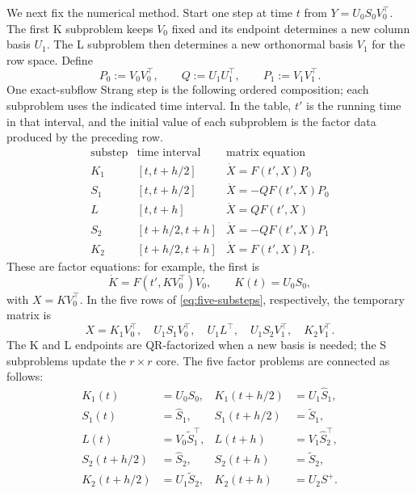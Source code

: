 \documentclass[10pt,a4paper]{amsart}
\numberwithin{equation}{section}
\begin{document}
We next fix the numerical method.  Start one step at time $t$ from
$Y=U_0S_0V_0^\top$.  The first K subproblem keeps $V_0$ fixed and
its endpoint determines a new column basis $U_1$.  The L subproblem
then determines a new orthonormal basis $V_1$ for the row space.  Define
\begin{equation}\label{eq:projectors-one-step}
 P_0:=V_0V_0^\top,\qquad Q:=U_1U_1^\top,
 \qquad P_1:=V_1V_1^\top.
\end{equation}
One exact-subflow Strang step is the following ordered composition; each
subproblem uses the indicated time interval.  In the table, \(t'\)
is the running time in that interval, and the initial value of each
subproblem is the factor data produced by the preceding row.
\begin{equation}\label{eq:five-substeps}
\begin{array}{c|c|c}
\text{substep}&\text{time interval}&\text{matrix equation}\\
\hline
K_1&[t,t+h/2]&\dot X=F(t',X)P_0\\
S_1&[t,t+h/2]&\dot X=-QF(t',X)P_0\\
L  &[t,t+h]  &\dot X=QF(t',X)\\
S_2&[t+h/2,t+h]&\dot X=-QF(t',X)P_1\\
K_2&[t+h/2,t+h]&\dot X=F(t',X)P_1.
\end{array}
\end{equation}
These are factor equations: for example, the first is
\[
 \dot K=F(t',KV_0^\top)V_0,\qquad K(t)=U_0S_0,
\]
with $X=KV_0^\top$.  In the five rows of
\eqref{eq:five-substeps}, respectively, the temporary matrix is
\begin{equation}\label{eq:five-factor-representations}
 X=K_1V_0^\top,\quad U_1S_1V_0^\top,\quad U_1L^\top,
 \quad U_1S_2V_1^\top,\quad K_2V_1^\top.
\end{equation}
The K and L endpoints are QR-factorized when a
new basis is needed; the S subproblems update the $r\times r$ core.
The five factor problems are connected as follows:
\begin{equation}\label{eq:factor-transfers}
\begin{aligned}
 K_1(t)&=U_0S_0,
 &K_1(t+h/2)&=U_1\widehat S_1,\\
 S_1(t)&=\widehat S_1,
 &S_1(t+h/2)&=\widetilde S_1,\\
 L(t)&=V_0\widetilde S_1^\top,
 &L(t+h)&=V_1\widehat S_2^\top,\\
 S_2(t+h/2)&=\widehat S_2,
 &S_2(t+h)&=\widetilde S_2,\\
 K_2(t+h/2)&=U_1\widetilde S_2,
 &K_2(t+h)&=U_2S^+.
\end{aligned}
\end{equation}
\end{document}
